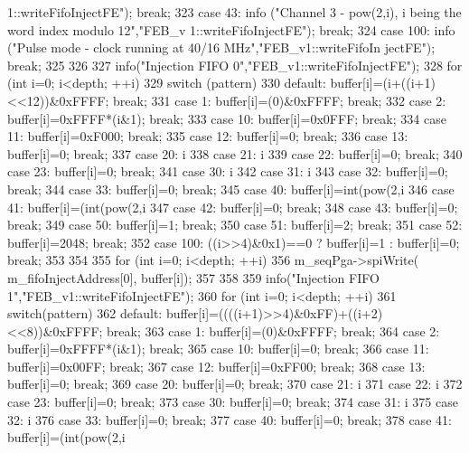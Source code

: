 \begin{DoxyCode}
{{      1::writeFifoInjectFE"); break;
323   case 43:  info ("Channel 3 - pow(2,i), i being the word index modulo 12","FEB_v
      1::writeFifoInjectFE"); break;
324   case 100:  info ("Pulse mode - clock running at 40/16 MHz","FEB_v1::writeFifoIn
      jectFE"); break;
325   }
326 
327   info("Injection FIFO 0","FEB_v1::writeFifoInjectFE");        
328   for (int i=0; i<depth; ++i){
329     switch (pattern){
330     default: buffer[i]=(i+((i+1)<<12))&0xFFFF; break;
331     case 1:   buffer[i]=(0)&0xFFFF; break;
332     case 2:   buffer[i]=0xFFFF*(i&1); break;
333     case 10:  buffer[i]=0x0FFF; break;
334     case 11:  buffer[i]=0xF000; break;
335     case 12:  buffer[i]=0; break;
336     case 13:  buffer[i]=0; break;
337     case 20:  i%
338     case 21:  i%
339     case 22:  buffer[i]=0; break;
340     case 23:  buffer[i]=0; break;
341     case 30:  i%
342     case 31:  i%
343     case 32:  buffer[i]=0; break;
344     case 33:  buffer[i]=0; break;
345     case 40:  buffer[i]=int(pow(2,i%
346     case 41:  buffer[i]=(int(pow(2,i%
347     case 42:  buffer[i]=0; break;
348     case 43:  buffer[i]=0; break;
349     case 50:  buffer[i]=1; break;
350     case 51:  buffer[i]=2; break;
351     case 52:  buffer[i]=2048; break;
352     case 100: ((i>>4)&0x1)==0 ? buffer[i]=1 : buffer[i]=0; break;
353     }
354    }
355   for (int i=0; i<depth; ++i){
356     m_seqPga->spiWrite( m_fifoInjectAddress[0], buffer[i]);
357   }
358   
359   info("Injection FIFO 1","FEB_v1::writeFifoInjectFE");        
360   for (int i=0; i<depth; ++i){ 
361     switch(pattern){
362     default:  buffer[i]=((((i+1)>>4)&0xFF)+((i+2)<<8))&0xFFFF; break;
363     case 1:   buffer[i]=(0)&0xFFFF; break;
364     case 2:   buffer[i]=0xFFFF*(i&1); break;
365     case 10:  buffer[i]=0; break;
366     case 11:  buffer[i]=0x00FF; break;
367     case 12:  buffer[i]=0xFF00; break;
368     case 13:  buffer[i]=0; break;
369     case 20:  buffer[i]=0; break;
370     case 21:  i%
371     case 22:  i%
372     case 23:  buffer[i]=0; break;
373     case 30:  buffer[i]=0; break;
374     case 31:  i%
375     case 32:  i%
376     case 33:  buffer[i]=0; break;
377     case 40:  buffer[i]=0; break;
378     case 41:  buffer[i]=(int(pow(2,i%
}}}
\end{DoxyCode}
